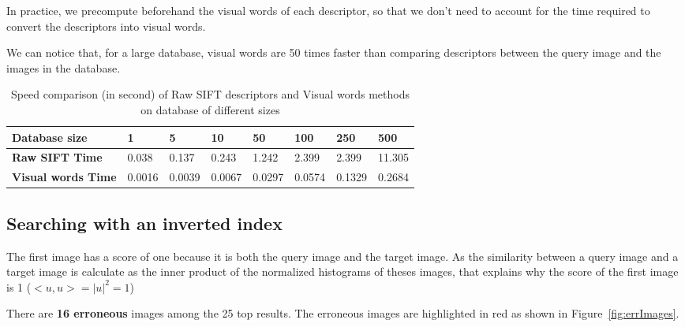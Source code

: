 \documentclass{article}
\begin{document}
In practice, we precompute beforehand the visual words of each descriptor, so that we don't need to account for the time required to convert the descriptors into visual words.


We can notice that, for a large database, visual words are 50 times faster than comparing descriptors between the query image and the images in the database.

\begin{table}[H]
\centering
\begin{tabular}{@{}llllllll@{}}
\toprule
{\color[HTML]{000000} \textbf{Database size}} & {\color[HTML]{000000} \textbf{1}} & {\color[HTML]{000000} \textbf{5}} & {\color[HTML]{000000} \textbf{10}} & \textbf{50} & \textbf{100} & \textbf{250} & \textbf{500} \\ \midrule
\textbf{Raw SIFT Time} & 0.038 & 0.137 & 0.243 & 1.242 & 2.399 & 2.399 & 11.305 \\
\textbf{Visual words Time} & 0.0016 & 0.0039 & 0.0067 & 0.0297 & 0.0574 & 0.1329 & 0.2684 \\ \bottomrule
\end{tabular}
\caption{Speed comparison (in second) of Raw SIFT descriptors and Visual words methods on database of different sizes}
\label{speedTable}
\end{table}

\subsection{Searching with an inverted index}

The first image has a score of one because it is both the query image and the target image. As the similarity between a query image and a target image is calculate as the inner product of the normalized histograms of theses images, that explains why the score of the first image is 1 ($<u,u>= |u|^2 = 1$)


There are \textbf{16 erroneous} images among the 25 top results.
The erroneous images are highlighted in red as shown in Figure~\ref{fig:errImages}.
\end{document}
